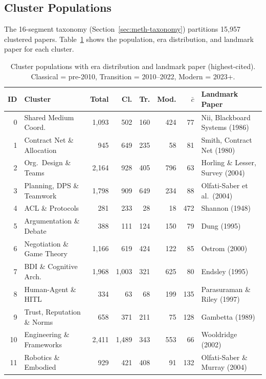 \documentclass{article}
\begin{document}
\subsection{Cluster Populations}

The 16-segment taxonomy (Section~\ref{sec:meth-taxonomy}) partitions 15,957
clustered papers. Table~\ref{tab:cluster-pops} shows the population, era
distribution, and landmark paper for each cluster.

\begin{table}[t]
\centering
\caption{Cluster populations with era distribution and landmark paper (highest-cited).
Classical = pre-2010, Transition = 2010--2022, Modern = 2023+.}
\label{tab:cluster-pops}
\footnotesize
\begin{tabular}{@{} r p{3.8cm} r r r r r p{4cm} @{}}
\toprule
\textbf{ID} & \textbf{Cluster} & \textbf{Total} & \textbf{Cl.} & \textbf{Tr.} & \textbf{Mod.} & \textbf{$\bar{c}$} & \textbf{Landmark Paper} \\
\midrule
0  & Shared Medium Coord.          & 1,093 & 502   & 160 & 424  & 77  & Nii, Blackboard Systems (1986) \\
1  & Contract Net \& Allocation    & 945   & 649   & 235 & 58   & 81  & Smith, Contract Net (1980) \\
2  & Org.\ Design \& Teams         & 2,164 & 928   & 405 & 796  & 63  & Horling \& Lesser, Survey (2004) \\
3  & Planning, DPS \& Teamwork     & 1,798 & 909   & 649 & 234  & 88  & Olfati-Saber et al.\ (2004) \\
4  & ACL \& Protocols              & 281   & 233   & 28  & 18   & 472 & Shannon (1948) \\
5  & Argumentation \& Debate       & 388   & 111   & 124 & 150  & 79  & Dung (1995) \\
6  & Negotiation \& Game Theory    & 1,166 & 619   & 424 & 122  & 85  & Ostrom (2000) \\
7  & BDI \& Cognitive Arch.        & 1,968 & 1,003 & 321 & 625  & 80  & Endsley (1995) \\
8  & Human-Agent \& HITL           & 334   & 63    & 68  & 199  & 135 & Parasuraman \& Riley (1997) \\
9  & Trust, Reputation \& Norms    & 658   & 371   & 211 & 75   & 128 & Gambetta (1989) \\
10 & Engineering \& Frameworks     & 2,411 & 1,489 & 343 & 553  & 66  & Wooldridge (2002) \\
11 & Robotics \& Embodied          & 929   & 421   & 408 & 91   & 132 & Olfati-Saber \& Murray (2004) \\

\end{tabular}
\end{table}
\end{document}
